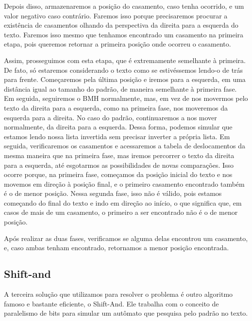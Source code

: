 \documentclass[12pt]{article}
\begin{document}
            Depois disso, armazenaremos a posição do casamento, caso tenha ocorrido, e um valor negativo caso contrário. 
            Faremos isso porque precisaremos procurar a existência de casamentos olhando da perspectiva da direita para a 
            esquerda do texto. Faremos isso mesmo que tenhamos encontrado um casamento na primeira etapa, pois queremos 
            retornar a primeira posição onde ocorreu o casamento.
            
            Assim, prosseguimos com esta etapa, que é extremamente semelhante à primeira. De fato, só estaremos considerando 
            o texto como se estivéssemos lendo-o de trás para frente. Começaremos pela última posição e iremos para a 
            esquerda, em uma distância igual ao tamanho do padrão, de maneira semelhante à primeira fase. Em seguida, 
            seguiremos o BMH normalmente, mas, em vez de nos movermos pelo texto da direita para a esquerda, como na primeira 
            fase, nos moveremos da esquerda para a direita. No caso do padrão, continuaremos a nos mover normalmente, da 
            direita para a esquerda. Dessa forma, podemos simular que estamos lendo nossa lista invertida sem precisar inverter 
            a própria lista. Em seguida, verificaremos os casamentos e acessaremos a tabela de deslocamentos da mesma maneira 
            que na primeira fase, mas iremos percorrer o texto da direita para a esquerda, até esgotarmos as possibilidades de 
            novas comparações. Isso ocorre porque, na primeira fase, começamos da posição inicial do texto e nos movemos em 
            direção à posição final, e o primeiro casamento encontrado também é o de menor posição. Nessa segunda fase, isso 
            não é válido, pois estamos começando do final do texto e indo em direção ao início, o que significa que, em casos 
            de mais de um casamento, o primeiro a ser encontrado não é o de menor posição.
            
            Após realizar as duas fases, verificamos se alguma delas encontrou um casamento, e, caso ambas tenham encontrado, 
            retornamos a menor posição encontrada.
        
        
        \subsection{Shift-and}
            A terceira solução que utilizamos para resolver o problema é outro algoritmo famoso e bastante eficiente, o Shift-And. 
            Ele trabalha com o conceito de paralelismo de bits para simular um autômato que pesquisa pelo padrão no texto.
\end{document}
